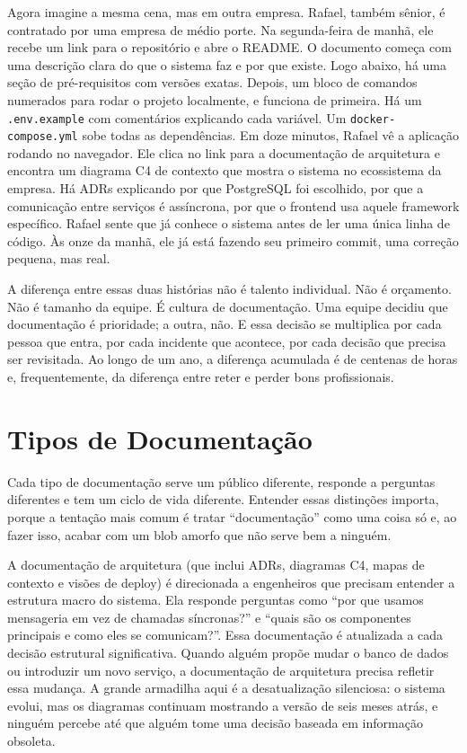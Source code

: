 Agora imagine a mesma cena, mas em outra empresa. Rafael, também sênior, é
contratado por uma empresa de médio porte. Na segunda-feira de manhã, ele
recebe um link para o repositório e abre o README. O documento começa com
uma descrição clara do que o sistema faz e por que existe. Logo abaixo, há
uma seção de pré-requisitos com versões exatas. Depois, um bloco de comandos
numerados para rodar o projeto localmente, e funciona de primeira. Há um
\texttt{.env.example} com comentários explicando cada variável. Um
\texttt{docker-compose.yml} sobe todas as dependências. Em doze minutos,
Rafael vê a aplicação rodando no navegador. Ele clica no link para a
documentação de arquitetura e encontra um diagrama C4 de contexto que mostra
o sistema no ecossistema da empresa. Há ADRs explicando por que PostgreSQL
foi escolhido, por que a comunicação entre serviços é assíncrona, por que
o frontend usa aquele framework específico. Rafael sente que já conhece o
sistema antes de ler uma única linha de código. Às onze da manhã, ele já
está fazendo seu primeiro commit, uma correção pequena, mas real.

A diferença entre essas duas histórias não é talento individual. Não é
orçamento. Não é tamanho da equipe. É cultura de documentação. Uma equipe
decidiu que documentação é prioridade; a outra, não. E essa decisão se
multiplica por cada pessoa que entra, por cada incidente que acontece, por
cada decisão que precisa ser revisitada. Ao longo de um ano, a diferença
acumulada é de centenas de horas e, frequentemente, da diferença entre
reter e perder bons profissionais.


\section{Tipos de Documentação}

Cada tipo de documentação serve um público diferente, responde a perguntas
diferentes e tem um ciclo de vida diferente. Entender essas distinções
importa, porque a tentação mais comum é tratar ``documentação'' como
uma coisa só e, ao fazer isso, acabar com um blob amorfo que não serve
bem a ninguém.

A documentação de arquitetura (que inclui ADRs, diagramas C4, mapas de
contexto e visões de deploy) é
direcionada a engenheiros que precisam entender a estrutura macro do
sistema. Ela responde perguntas como ``por que usamos mensageria em vez
de chamadas síncronas?'' e ``quais são os componentes principais e como
eles se comunicam?''. Essa documentação é atualizada a cada decisão
estrutural significativa. Quando alguém propõe mudar o banco de dados ou
introduzir um novo serviço, a documentação de arquitetura precisa refletir
essa mudança. A grande armadilha aqui é a desatualização silenciosa: o
sistema evolui, mas os diagramas continuam mostrando a versão de seis
meses atrás, e ninguém percebe até que alguém tome uma decisão baseada
em informação obsoleta.

